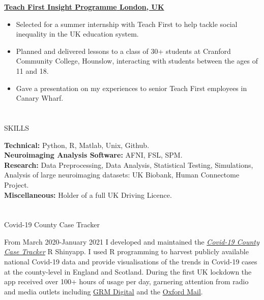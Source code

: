 \documentclass{my_cv}
\begin{document}
\vspace{0.2cm}
\uline{\large\bfseries{Teach First Insight Programme}  \hfill \large\bfseries{London, UK}}
{\begin{addmargin}[2em]{0em}
    \begin{itemize}[topsep=0pt,itemsep=0pt,partopsep=0pt, parsep=0pt] 
    \item Selected for a summer internship with Teach First to help tackle social inequality in the UK education system.
    \item Planned and delivered lessons to a class of 30+ students at Cranford Community College, Hounslow, interacting with students between the ages of 11 and 18.  
    \item Gave a presentation on my experiences to senior Teach First employees in Canary Wharf. 
     \end{itemize}
\end{addmargin}}

   


\section{\faGears}{SKILLS}

\textbf{Technical:} Python, R, Matlab, Unix, Github. \\
\textbf{Neuroimaging Analysis Software:} AFNI, FSL, SPM.  \\
\textbf{Research:} Data Preprocessing, Data Analysis, Statistical Testing, Simulations, Analysis of large neuroimaging datasets: UK Biobank, Human Connectome Project. \\
\textbf{Miscellaneous:} Holder of a full UK Driving Licence.

\section{\faLaptop}{Covid-19 County Case Tracker}

From March 2020-January 2021 I developed and maintained the \href{https://covid19cct.shinyapps.io/covid19cct/}{\textit{Covid-19 County Case Tracker}} R Shinyapp. I used R programming to harvest publicly available national Covid-19 data and provide visualisations of the trends in Covid-19 cases at the county-level in England and Scotland. During the first UK lockdown the app received over 100+ hours of usage per day, garnering attention from radio and media outlets including \href{https://grm.digital/heroes-of-covid19/info/}{GRM Digital} and the \href{https://www.oxfordmail.co.uk/news/18358052.app-tracks-oxfordshire-covid-19-cases/}{Oxford Mail}.
\end{document}
